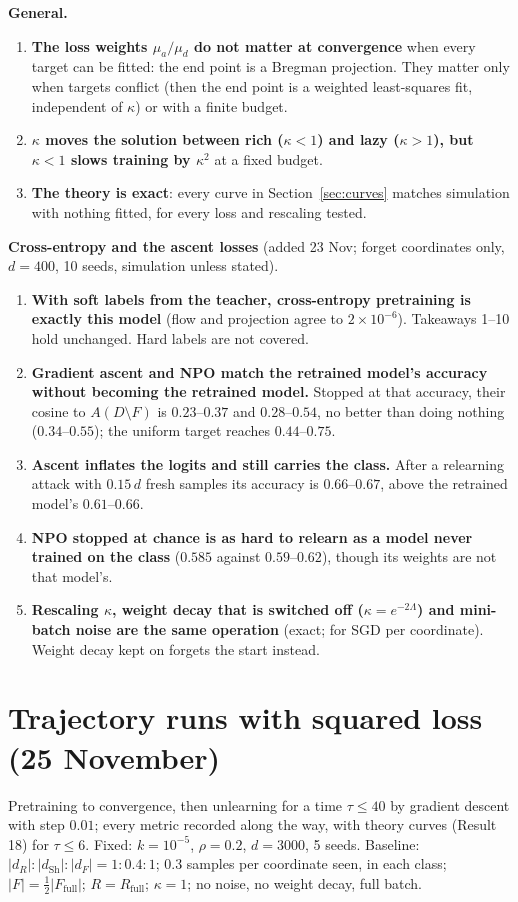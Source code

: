 \documentclass[10pt]{article}
\newcommand{\Rf}{R_{\mathrm{full}}}\newcommand{\Ff}{F_{\mathrm{full}}}\newcommand{\dSh}{d_{\mathrm{Sh}}}
\begin{document}
\textbf{General.}
\begin{enumerate}\setlength{\itemsep}{1pt}\setcounter{enumi}{7}
\item \textbf{The loss weights $\mu_a/\mu_d$ do not matter at convergence} when every target can be fitted: the end point is a Bregman projection. They matter only when targets conflict (then the end point is a weighted least-squares fit, independent of $\kappa$) or with a finite budget.
\item \textbf{$\kappa$ moves the solution between rich ($\kappa<1$) and lazy ($\kappa>1$), but $\kappa<1$ slows training by $\kappa^2$} at a fixed budget.
\item \textbf{The theory is exact}: every curve in Section~\ref{sec:curves} matches simulation with nothing fitted, for every loss and rescaling tested.
\end{enumerate}

\textbf{Cross-entropy and the ascent losses} (added 23 Nov; forget coordinates only, $d=400$, 10 seeds, simulation unless stated).
\begin{enumerate}\setlength{\itemsep}{1pt}\setcounter{enumi}{10}
\item \textbf{With soft labels from the teacher, cross-entropy pretraining is exactly this model} (flow and projection agree to $2\times10^{-6}$). Takeaways 1--10 hold unchanged. Hard labels are not covered.
\item \textbf{Gradient ascent and NPO match the retrained model's accuracy without becoming the retrained model.} Stopped at that accuracy, their cosine to $A(D\setminus F)$ is $0.23$--$0.37$ and $0.28$--$0.54$, no better than doing nothing ($0.34$--$0.55$); the uniform target reaches $0.44$--$0.75$.
\item \textbf{Ascent inflates the logits and still carries the class.} After a relearning attack with $0.15\,d$ fresh samples its accuracy is $0.66$--$0.67$, above the retrained model's $0.61$--$0.66$.
\item \textbf{NPO stopped at chance is as hard to relearn as a model never trained on the class} ($0.585$ against $0.59$--$0.62$), though its weights are not that model's.
\item \textbf{Rescaling $\kappa$, weight decay that is switched off ($\kappa=e^{-2\Lambda}$) and mini-batch noise are the same operation} (exact; for SGD per coordinate). Weight decay kept on forgets the start instead.
\end{enumerate}

\FloatBarrier
\section{Trajectory runs with squared loss (25 November)}\label{sec:runs}
Pretraining to convergence, then unlearning for a time $\tau\le40$ by gradient descent with step $0.01$; every metric recorded along the way, with theory curves (Result 18) for $\tau\le6$. Fixed: $k=10^{-5}$, $\rho=0.2$, $d=3000$, 5 seeds. Baseline: $|d_R|:|\dSh|:|d_F|=1:0.4:1$; $0.3$ samples per coordinate seen, in each class; $|F|=\frac12|\Ff|$; $R=\Rf$; $\kappa=1$; no noise, no weight decay, full batch.
\end{document}
